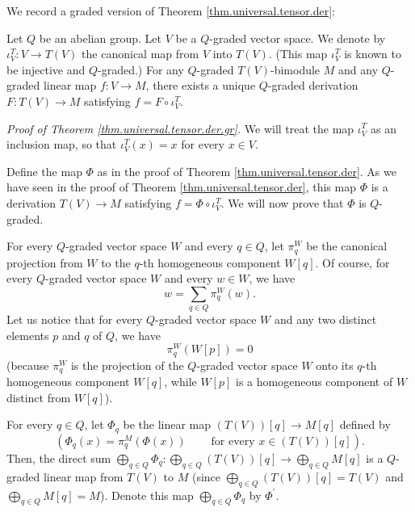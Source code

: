 \documentclass[etingof-lie.tex]{subfiles}
\begin{document}
\begin{verlong}
We record a graded version of Theorem \ref{thm.universal.tensor.der}:

\begin{theorem}
\label{thm.universal.tensor.der.gr}Let $Q$ be an abelian group. Let $V$ be a
$Q$-graded vector space. We denote by $\iota_{V}^{T}:V\rightarrow T\left(
V\right)  $ the canonical map from $V$ into $T\left(  V\right)  $. (This map
$\iota_{V}^{T}$ is known to be injective and $Q$-graded.) For any $Q$-graded
$T\left(  V\right)  $-bimodule $M$ and any $Q$-graded linear map
$f:V\rightarrow M$, there exists a unique $Q$-graded derivation $F:T\left(
V\right)  \rightarrow M$ satisfying $f=F\circ\iota_{V}^{T}$.
\end{theorem}

\textit{Proof of Theorem \ref{thm.universal.tensor.der.gr}.} We will treat the
map $\iota_{V}^{T}$ as an inclusion map, so that $\iota_{V}^{T}\left(
x\right)  =x$ for every $x\in V$.

Define the map $\Phi$ as in the proof of Theorem
\ref{thm.universal.tensor.der}. As we have seen in the proof of Theorem
\ref{thm.universal.tensor.der}, this map $\Phi$ is a derivation $T\left(
V\right)  \rightarrow M$ satisfying $f=\Phi\circ\iota_{V}^{T}$. We will now
prove that $\Phi$ is $Q$-graded.

For every $Q$-graded vector space $W$ and every $q\in Q$, let $\pi_{q}^{W}$ be
the canonical projection from $W$ to the $q$-th homogeneous component
$W\left[  q\right]  $. Of course, for every $Q$-graded vector space $W$ and
every $w\in W$, we have%
\begin{equation}
w=\sum\limits_{q\in Q}\pi_{q}^{W}\left(  w\right)  .
\label{pf.universal.tensor.der.gr.0}%
\end{equation}
Let us notice that for every $Q$-graded vector space $W$ and any two distinct
elements $p$ and $q$ of $Q$, we have%
\begin{equation}
\pi_{q}^{W}\left(  W\left[  p\right]  \right)  =0
\label{pf.universal.tensor.der.gr.0a}%
\end{equation}
(because $\pi_{q}^{W}$ is the projection of the $Q$-graded vector space $W$
onto its $q$-th homogeneous component $W\left[  q\right]  $, while $W\left[
p\right]  $ is a homogeneous component of $W$ distinct from $W\left[
q\right]  $).

For every $q\in Q$, let $\Phi_{q}$ be the linear map $\left(  T\left(
V\right)  \right)  \left[  q\right]  \rightarrow M\left[  q\right]  $ defined
by%
\[
\left(  \Phi_{q}\left(  x\right)  =\pi_{q}^{M}\left(  \Phi\left(  x\right)
\right)  \ \ \ \ \ \ \ \ \ \ \text{for every }x\in\left(  T\left(  V\right)
\right)  \left[  q\right]  \right)  .
\]
Then, the direct sum $\bigoplus\limits_{q\in Q}\Phi_{q}:\bigoplus\limits_{q\in
Q}\left(  T\left(  V\right)  \right)  \left[  q\right]  \rightarrow
\bigoplus\limits_{q\in Q}M\left[  q\right]  $ is a $Q$-graded linear map from
$T\left(  V\right)  $ to $M$ (since $\bigoplus\limits_{q\in Q}\left(  T\left(
V\right)  \right)  \left[  q\right]  =T\left(  V\right)  $ and $\bigoplus
\limits_{q\in Q}M\left[  q\right]  =M$). Denote this map $\bigoplus
\limits_{q\in Q}\Phi_{q}$ by $\Phi^{\prime}$.


\end{verlong}
\end{document}
